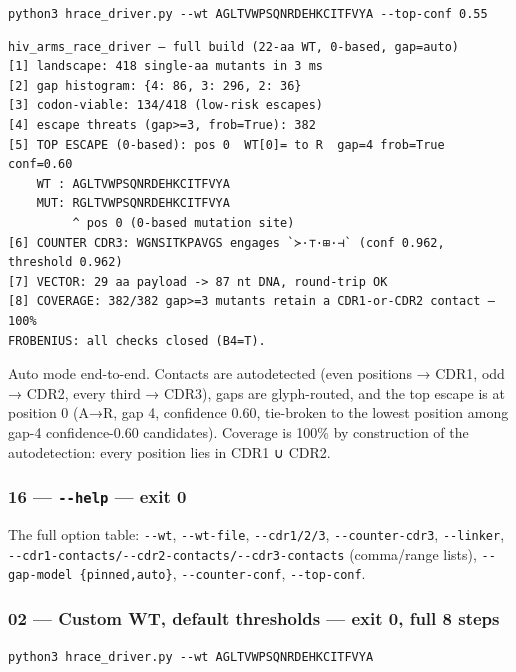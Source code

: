 \documentclass[12pt,a4paper]{article}
\begin{document}
\texttt{python3\ hrace\_driver.py\ -\/-wt\ AGLTVWPSQNRDEHKCITFVYA\ -\/-top-conf\ 0.55}

\begin{verbatim}
hiv_arms_race_driver — full build (22-aa WT, 0-based, gap=auto)
[1] landscape: 418 single-aa mutants in 3 ms
[2] gap histogram: {4: 86, 3: 296, 2: 36}
[3] codon-viable: 134/418 (low-risk escapes)
[4] escape threats (gap>=3, frob=True): 382
[5] TOP ESCAPE (0-based): pos 0  WT[0]= to R  gap=4 frob=True conf=0.60
    WT : AGLTVWPSQNRDEHKCITFVYA
    MUT: RGLTVWPSQNRDEHKCITFVYA
         ^ pos 0 (0-based mutation site)
[6] COUNTER CDR3: WGNSITKPAVGS engages `≻·⊤·⊞·⊣` (conf 0.962, threshold 0.962)
[7] VECTOR: 29 aa payload -> 87 nt DNA, round-trip OK
[8] COVERAGE: 382/382 gap>=3 mutants retain a CDR1-or-CDR2 contact — 100%
FROBENIUS: all checks closed (B4=T).
\end{verbatim}

Auto mode end-to-end. Contacts are autodetected (even positions → CDR1,
odd → CDR2, every third → CDR3), gaps are glyph-routed, and the top
escape is at position 0 (A→R, gap 4, confidence 0.60, tie-broken to the
lowest position among gap-4 confidence-0.60 candidates). Coverage is
100\% by construction of the autodetection: every position lies in CDR1
∪ CDR2.

\hypertarget{help-exit-0}{%
\subsubsection{\texorpdfstring{16 --- \texttt{-\/-help} --- exit
0}{16 --- -\/-help --- exit 0}}\label{help-exit-0}}

The full option table: \texttt{-\/-wt}, \texttt{-\/-wt-file},
\texttt{-\/-cdr1/2/3}, \texttt{-\/-counter-cdr3}, \texttt{-\/-linker},
\texttt{-\/-cdr1-contacts/-\/-cdr2-contacts/-\/-cdr3-contacts}
(comma/range lists), \texttt{-\/-gap-model\ \{pinned,auto\}},
\texttt{-\/-counter-conf}, \texttt{-\/-top-conf}.

\hypertarget{custom-wt-default-thresholds-exit-0-full-8-steps}{%
\subsubsection{02 --- Custom WT, default thresholds --- exit 0, full 8
steps}\label{custom-wt-default-thresholds-exit-0-full-8-steps}}

\texttt{python3\ hrace\_driver.py\ -\/-wt\ AGLTVWPSQNRDEHKCITFVYA}
\end{document}
